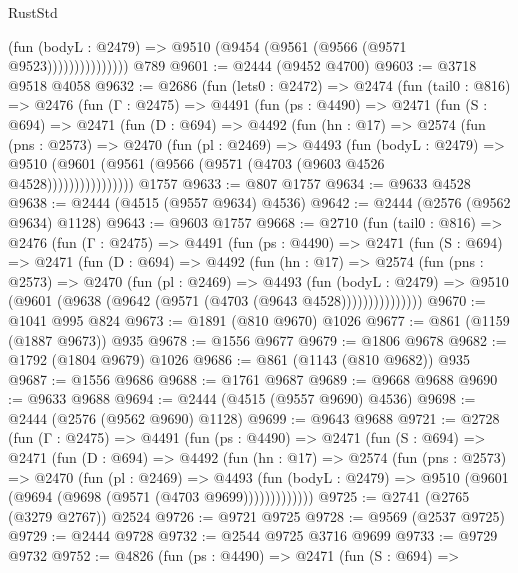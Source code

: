 \begin{lexlean}{RustStd}
\begin{coremodule}
                        (fun (bodyL : @2479) =>
                        @9510 (@9454 (@9561 (@9566 (@9571 @9523)))))))))))))))
    @789
@9601 := @2444 (@9452 @4700)
@9603 := @3718 @9518 @4058
@9632 := @2686
    (fun (lets0 : @2472) =>
    @2474
      (fun (tail0 : @816) =>
      @2476
        (fun (Γ : @2475) =>
        @4491
          (fun (ps : @4490) =>
          @2471
            (fun (S : @694) =>
            @2471
              (fun (D : @694) =>
              @4492
                (fun (hn : @17) =>
                @2574
                  (fun (pns : @2573) =>
                  @2470
                    (fun (pl : @2469) =>
                    @4493
                      (fun (bodyL : @2479) =>
                      @9510 (@9601 (@9561 (@9566 (@9571 (@4703 (@9603 @4526 @4528))))))))))))))))
    @1757
@9633 := @807 @1757
@9634 := @9633 @4528
@9638 := @2444 (@4515 (@9557 @9634) @4536)
@9642 := @2444 (@2576 (@9562 @9634) @1128)
@9643 := @9603 @1757
@9668 := @2710
    (fun (tail0 : @816) =>
    @2476
      (fun (Γ : @2475) =>
      @4491
        (fun (ps : @4490) =>
        @2471
          (fun (S : @694) =>
          @2471
            (fun (D : @694) =>
            @4492
              (fun (hn : @17) =>
              @2574
                (fun (pns : @2573) =>
                @2470
                  (fun (pl : @2469) =>
                  @4493
                    (fun (bodyL : @2479) =>
                    @9510 (@9601 (@9638 (@9642 (@9571 (@4703 (@9643 @4528)))))))))))))))
@9670 := @1041 @995 @824
@9673 := @1891 (@810 @9670) @1026
@9677 := @861 (@1159 (@1887 @9673)) @935
@9678 := @1556 @9677
@9679 := @1806 @9678
@9682 := @1792 (@1804 @9679) @1026
@9686 := @861 (@1143 (@810 @9682)) @935
@9687 := @1556 @9686
@9688 := @1761 @9687
@9689 := @9668 @9688
@9690 := @9633 @9688
@9694 := @2444 (@4515 (@9557 @9690) @4536)
@9698 := @2444 (@2576 (@9562 @9690) @1128)
@9699 := @9643 @9688
@9721 := @2728
    (fun (Γ : @2475) =>
    @4491
      (fun (ps : @4490) =>
      @2471
        (fun (S : @694) =>
        @2471
          (fun (D : @694) =>
          @4492
            (fun (hn : @17) =>
            @2574
              (fun (pns : @2573) =>
              @2470
                (fun (pl : @2469) =>
                @4493
                  (fun (bodyL : @2479) =>
                  @9510 (@9601 (@9694 (@9698 (@9571 (@4703 @9699)))))))))))))
@9725 := @2741 (@2765 (@3279 @2767)) @2524
@9726 := @9721 @9725
@9728 := @9569 (@2537 @9725)
@9729 := @2444 @9728
@9732 := @2544 @9725 @3716 @9699
@9733 := @9729 @9732
@9752 := @4826
    (fun (ps : @4490) =>
    @2471
      (fun (S : @694) =>

\end{coremodule}
\end{lexlean}
